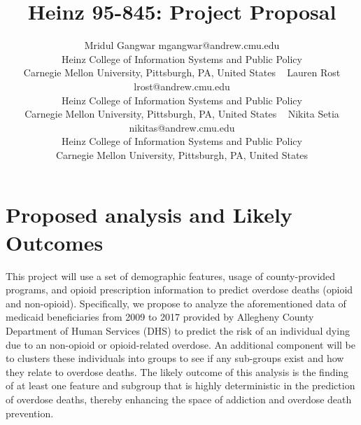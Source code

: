 \documentclass[twoside,11pt]{article}
\begin{document}
\title{Heinz 95-845: Project Proposal}

\author{\name Mridul Gangwar \email mgangwar@andrew.cmu.edu \\
       \addr Heinz College of Information Systems and Public Policy\\
       Carnegie Mellon University, Pittsburgh, PA, United States \
       \AND
       \name Lauren Rost \email lrost@andrew.cmu.edu \\
       \addr Heinz College of Information Systems and Public Policy\\
       Carnegie Mellon University, Pittsburgh, PA, United States \
       \AND
       \name Nikita Setia \email nikitas@andrew.cmu.edu \\
       \addr Heinz College of Information Systems and Public Policy\\
       Carnegie Mellon University, Pittsburgh, PA, United States}
\maketitle


\section{Proposed analysis and Likely Outcomes}
This project will use a set of demographic features, usage of county-provided programs, and opioid prescription information to predict overdose deaths (opioid and non-opioid). Specifically, we propose to analyze the aforementioned data of medicaid beneficiaries from 2009 to 2017 provided by Allegheny County Department of Human Services (DHS) to predict the risk of an individual dying due to an non-opioid or opioid-related overdose. An additional component will be to clusters these individuals into groups to see if any sub-groups exist and how they relate to overdose deaths. The likely outcome of this analysis is the finding of at least one feature and subgroup that is highly deterministic in the prediction of overdose deaths, thereby enhancing the space of addiction and overdose death prevention. 
\end{document}
